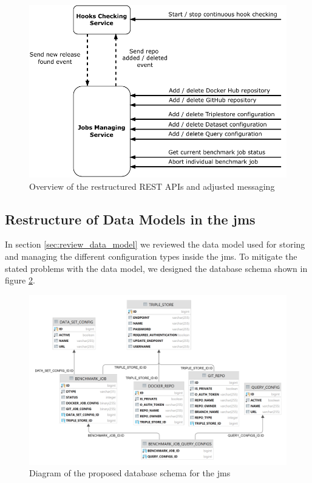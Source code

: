 \begin{figure}[tbph]
	\centering
	\includegraphics[width=.65\textwidth]{figures/messaging-implementation-hcs-jms.pdf}
	\caption{Overview of the restructured REST APIs and adjusted messaging}
	\label{fig:repo_management_restructure}
\end{figure}



\subsection{Restructure of Data Models in the \acl{jms}}
\label{sec:data_model_restructure_jms}
In section \ref{sec:review_data_model} we reviewed the data model used for storing and managing the different configuration types inside the \ac{jms}.
To mitigate the stated problems with the data model, we designed the database schema shown in figure \ref{fig:design_jms_db_schema}.

\begin{figure}[tbph]
	\centering
	\includegraphics[width=.95\textwidth]{figures/jms_db_schema_design.png}
	\caption{Diagram of the proposed database schema for the \ac{jms}}
	\label{fig:design_jms_db_schema}
\end{figure}

